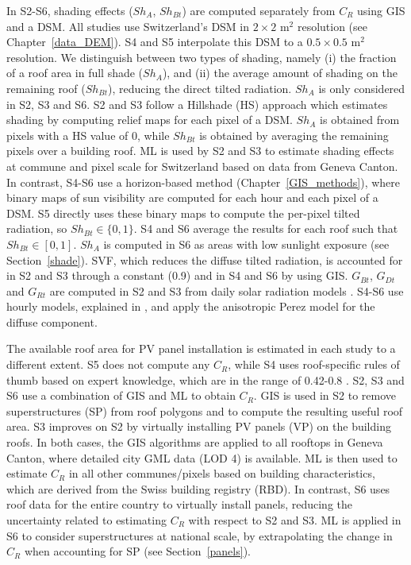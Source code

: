In S2-S6, shading effects ($Sh_A$, $Sh_{Bt}$) are computed separately from $C_R$ using GIS and a DSM. All studies use Switzerland’s DSM in $2 \times 2$ m$^2$ resolution (see Chapter~\ref{data_DEM}). S4 and S5 interpolate this DSM to a $0.5 \times 0.5$ m$^2$ resolution. We distinguish between two types of shading, namely (i) the fraction of a roof area in full shade ($Sh_A$), and (ii) the average amount of shading on the remaining roof ($Sh_{Bt}$), reducing the direct tilted radiation. $Sh_A$ is only considered in S2, S3 and S6. S2 and S3 follow a Hillshade (HS) approach which estimates shading by computing relief maps for each pixel of a DSM. $Sh_A$ is obtained from pixels with a HS value of 0, while $Sh_{Bt}$ is obtained by averaging the remaining pixels over a building roof. ML is used by S2 and S3 to estimate shading effects at commune and pixel scale for Switzerland based on data from Geneva Canton. In contrast, S4-S6 use a horizon-based method (Chapter~\ref{GIS_methods}), where binary maps of sun visibility are computed for each hour and each pixel of a DSM. S5 directly uses these binary maps to compute the per-pixel tilted radiation, so $Sh_{Bt} \in \{0, 1\}$. S4 and S6 average the results for each roof such that $Sh_{Bt} \in [0, 1]$. $Sh_A$ is computed in S6 as areas with low sunlight exposure (see Section~\ref{shade}). SVF, which reduces the diffuse tilted radiation, is accounted for in S2 and S3 through a constant (0.9) and in S4 and S6 by using GIS. $G_{Bt}$, $G_{Dt}$ and $G_{Rt}$ are computed in S2 and S3 from daily solar radiation models \cite{assouline_quantifying_2017, assouline_large-scale_2018}. S4-S6 use hourly models, explained in \cite{perez_modeling_1990}, and apply the anisotropic Perez model for the diffuse component.

The available roof area for PV panel installation is estimated in each study to a different extent. S5 does not compute any $C_R$, while S4 uses roof-specific rules of thumb based on expert knowledge, which are in the range of 0.42-0.8 \cite{portmann_sonnendach.ch:_2016}. S2, S3 and S6 use a combination of GIS and ML to obtain $C_R$. GIS is used in S2 to remove superstructures (SP) from roof polygons and to compute the resulting useful roof area. S3 improves on S2 by virtually installing PV panels (VP) on the building roofs. In both cases, the GIS algorithms are applied to all rooftops in Geneva Canton, where detailed city GML data (LOD 4) is available. ML is then used to estimate $C_R$ in all other communes/pixels based on building characteristics, which are derived from the Swiss building registry (RBD). In contrast, S6 uses roof data for the entire country to virtually install panels, reducing the uncertainty related to estimating $C_R$ with respect to S2 and S3. ML is applied in S6 to consider superstructures at national scale, by extrapolating the change in $C_R$ when accounting for SP (see Section~\ref{panels}).

